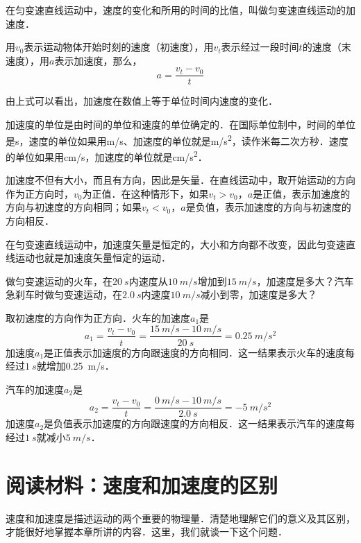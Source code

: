 在匀变速直线运动中，速度的变化和所用的时间的比值，叫做匀变速直线运动的加速度．

用$v_0$表示运动物体开始时刻的速度（初速度），用$v_t$表示经过一段时间$t$的速度（末速度），用$a$表示加速度，那么，
\begin{equation}
    a=\frac{v_t-v_0}{t}
\end{equation}

由上式可以看出，加速度在数值上等于单位时间内速度的变化．

加速度的单位是由时间的单位和速度的单位确定的．在国际单位制中，时间的单位是\si{s}，速度的单位如果用\si{m/s}、加速度的单位就是\si{m/s^2}，读作米每二次方秒．速度的单位如果用\si{cm/s}，加速度的单位就是\si{cm/s^2}．

加速度不但有大小，而且有方向，因此是矢量．在直线运动中，取开始运动的方向作为正方向时，$v_0$为正值．在这种情形下，如果$v_t>v_0$，$a$是正值，表示加速度的方向与初速度的方向相同；如果$v_t<v_0$，$a$是负值，表示加速度的方向与初速度的方向相反．

在匀变速直线运动中，加速度矢量是恒定的，大小和方向都不改变，因此匀变速直线运动也就是加速度矢量恒定的运动．

\begin{example}
    做匀变速运动的火车，在$\qty{20}{s}$内速度从$\qty{10}{m/s}$增加到$\qty{15}{m/s}$，加速度是多大？汽车急刹车时做匀变速运动，在$\qty{2.0}{s}$内速度$\qty{10}{m/s}$减小到零，加速度是多大？
\end{example}

\begin{solution}
    取初速度的方向作为正方向．火车的加速度$a_1$是
    \[a_1=\frac{v_t-v_0}{t}=\frac{\qty{15}{m/s}-\qty{10}{m/s}}{\qty{20}{s}}=\qty{0.25}{m/s^2} \]
    加速度$a_1$是正值表示加速度的方向跟速度的方向相同．这一结果表示火车的速度每经过$\qty{1}{s}就增加$\qty{0.25}{m/s}．

    汽车的加速度$a_2$是
    \[a_2=\frac{v_t-v_0}{t}=\frac{\qty{0}{m/s}-\qty{10}{m/s}}{\qty{2.0}{s}}=\qty{-5}{m/s^2} \]
    加速度$a_2$是负值表示加速度的方向跟速度的方向相反．这一结果表示汽车的速度每经过$\qty{1}{s}$就减小$\qty{5}{m/s}$．

\end{solution}

\section*{阅读材料：速度和加速度的区别}

速度和加速度是描述运动的两个重要的物理量．清楚地理解它们的意义及其区别，才能很好地掌握本章所讲的内容．这里，我们就谈一下这个问题．

